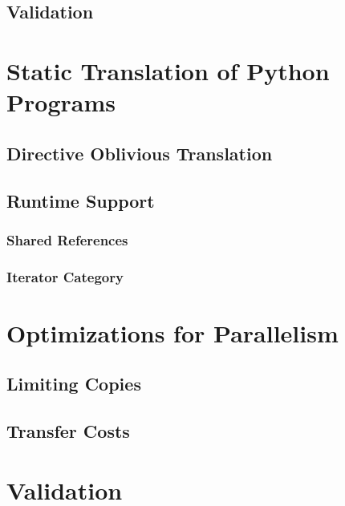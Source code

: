 \documentclass{llncs}
\begin{document}
\subsection{Validation}

\cite{wang2012}

\section{Static Translation of Python Programs}\label{sec:python-static}

\subsection{Directive Oblivious Translation}

\subsection{Runtime Support}

\subsubsection{Shared References}

\subsubsection{Iterator Category}

\section{Optimizations for Parallelism}\label{sec:python-optim}

\subsection{Limiting Copies}

\subsection{Transfer Costs}

\section{Validation}\label{sec:validation}
\end{document}
